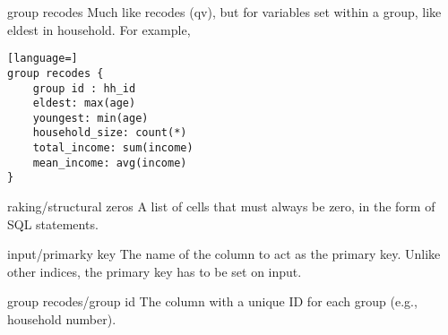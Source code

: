 \begin{key}{group recodes}
 Much like recodes (qv), but for variables set within a group, like
eldest in household.
For example,
\begin{lstlisting}[language=]
group recodes { 
    group id : hh_id
    eldest: max(age)
    youngest: min(age)
    household_size: count(*)
    total_income: sum(income)
    mean_income: avg(income)
}
\end{lstlisting}

\end{key}

\begin{key}{raking/structural zeros}
 A list of cells that must always be zero, 
     in the form of SQL statements. 
     
\end{key}

\begin{key}{input/primarky key}
 The name of the column to act as the primary key. Unlike other indices, the primary key has to be set on input.
\end{key}

\begin{key}{group recodes/group id}
 The column with a unique ID for each group (e.g., household number).
\end{key}

